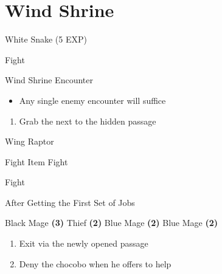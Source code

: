 \chapter{Wind Shrine}

\vspace{\baselineskip}

\begin{paracol}{2}

\begin{encounter}{White Snake (5 EXP)}
	\varwb
	\begin{notes}
		\item {}
	\end{notes}
	\begin{round}{1}
		\faris Fight
	\end{round}
	\varwe
\end{encounter}

\switchcolumn
\begin{steproute}{Wind Shrine Encounter}
	\begin{itemize}[leftmargin=*]
		\item[] Any single enemy encounter will suffice
	\end{itemize}
\end{steproute}

\switchcolumn
\begin{enumerate}
	\item Grab the  next to the hidden passage
\end{enumerate}

\begin{boss}{Wing Raptor}
	\varwb
	\begin{round}{1}
		\everyone Fight
		\galuf Item \then {} \then Fight
	\end{round}
	\begin{round}{2}
		\everyone Fight
	\end{round}
	\varwe
\end{boss}

\begin{menu}{After Getting the First Set of Jobs}
	\varwb
	\begin{jobMenu}
		\faris Black Mage \textbf{(3\pointLeft)}
		\bartz Thief \textbf{(2\pointRight)} \optimize
		\lenna Blue Mage \textbf{(2\pointLeft)} \optimize
		\galuf Blue Mage \textbf{(2\pointLeft)} \optimize
	\end{jobMenu}
	\varwe
\end{menu}

\begin{enumerate}[resume]
	\item Exit via the newly opened passage
	\item Deny the chocobo when he offers to help 
\end{enumerate}

\end{paracol}

